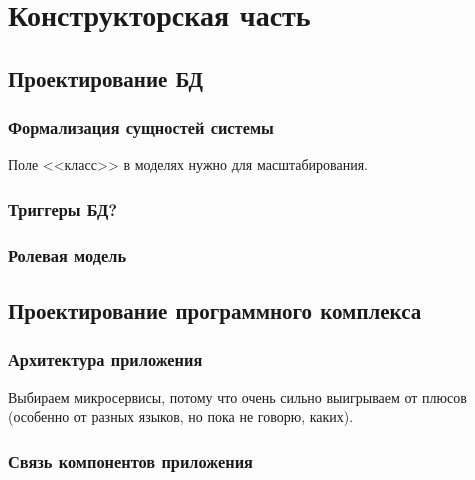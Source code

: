 \section{Конструкторская часть}


\subsection{Проектирование БД}

\subsubsection{Формализация сущностей системы}

Поле <<класс>> в моделях нужно для масштабирования.

\subsubsection{Триггеры БД?}

\subsubsection{Ролевая модель}



\subsection{Проектирование программного комплекса}

\subsubsection{Архитектура приложения}




Выбираем микросервисы, потому что очень сильно выигрываем от плюсов (особенно от разных языков, но пока не говорю, каких).



\subsubsection{Связь компонентов приложения}


